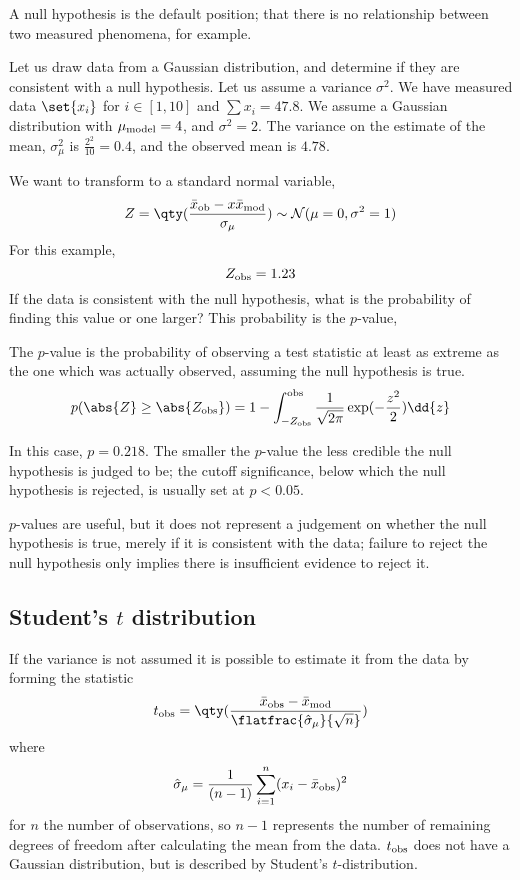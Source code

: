 \documentclass{dwnotes}         		        %
\begin{document}
\begin{definition}
  A null hypothesis is the default position; that there is no
  relationship between two measured phenomena, for example.
\end{definition}

Let us draw data from a Gaussian distribution, and determine if they
are consistent with a null hypothesis. Let us assume a variance
$\sigma^2$. We have measured data $\set{x_i}$ for $i \in [1,10]$ and
$\sum x_i = 47.8$. We assume a Gaussian distribution with $\mu_{\rm
  model} = 4$, and $\sigma^2=2$. The variance on the estimate of the
mean, $\sigma^2_{\mu}$ is $\frac{2^2}{10} = 0.4$, and the observed
mean is $4.78$.

We want to transform to a standard normal variable,
\begin{equation}
  \label{eq:5}
  Z = \qty( \frac{\bar{x}_{\rm ob} - x\bar{x}_{\rm mod}}{\sigma_{\mu}} ) \sim \mathcal{N}(\mu=0, \sigma^2=1)
\end{equation}
For this example,
\[ Z_{\rm obs} = 1.23 \] If the data is consistent with the null
hypothesis, what is the probability of finding this value or one
larger?
This probability is the $p$-value,

\begin{definition}[$p$-value]
  The $p$-value is the probability of observing a test statistic at
  least as extreme as the one which was actually observed, assuming
  the null hypothesis is true.
  \[ p(\abs{Z} \ge \abs{Z_{\rm obs}}) = 1 - \int_{-Z_{\rm obs}}^{\rm
    obs} \frac{1}{\sqrt{2 \pi}} \exp(- \frac{z^2}{2}) \dd{z} \]
\end{definition}

In this case, $p=0.218$. The smaller the $p$-value the less credible
the null hypothesis is judged to be; the cutoff significance, below
which the null hypothesis is rejected, is usually set at $p<0.05$.

$p$-values are useful, but it does not represent a judgement on
whether the null hypothesis is true, merely if it is consistent with
the data; failure to reject the null hypothesis only implies there is
insufficient evidence to reject it.

\subsection{Student's $t$ distribution}
\label{sec:stud-t-distr}

If the variance is not assumed it is possible to estimate it from the
data by forming the statistic
\[ t_{\rm obs} = \qty( \frac{\bar{x}_{\rm obs} - \bar{x}_{\rm
    mod}}{\flatfrac{\hat{\sigma}_{\mu}}{\sqrt{n}}} ) \]
where
\[ \hat{\sigma}_{\mu} = \frac{1}{(n-1)} \sum_{i=1}^n (x_i -
\bar{x}_{\rm obs})^2 \] for $n$ the number of observations, so $n-1$
represents the number of remaining degrees of freedom after
calculating the mean from the data.  $t_{\rm obs}$ does not have a
Gaussian distribution, but is described by Student's $t$-distribution.
\end{document}
